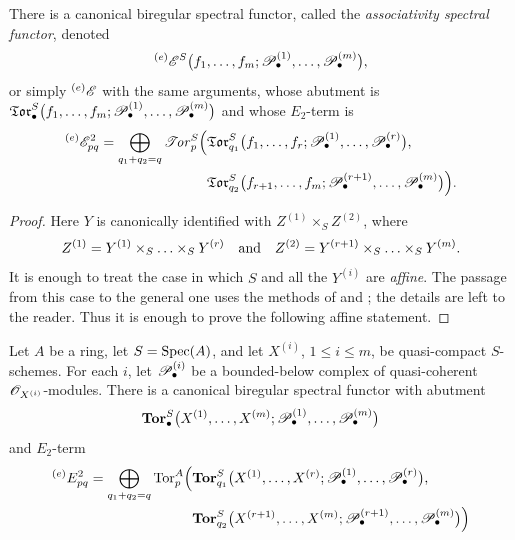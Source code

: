 \begin{proposition}[6.8.2]
\label{III.6.8.2}
There is a canonical biregular spectral functor, called the
\emph{associativity spectral functor}, denoted
\[
  {}^{(e)}\mathscr{E}^S
  \bigl(
    f_1,\ldots,f_m;
    \mathscr{P}_\bullet^{(1)},\ldots,\mathscr{P}_\bullet^{(m)}
  \bigr),
\]
or simply ${}^{(e)}\mathscr{E}$ with the same arguments, whose abutment
is $\mathfrak{Tor}_\bullet^S
\bigl(
f_1,\ldots,f_m;
\mathscr{P}_\bullet^{(1)},\ldots,\mathscr{P}_\bullet^{(m)}
\bigr)$
and whose $E_2$-term is
\[
\begin{split}
  {}^{(e)}\mathscr{E}_{pq}^2
  =
  \bigoplus_{q_1+q_2=q}
  \mathscr{T}\!\mathit{or}_p^S
  \Bigl(
    &
    \mathfrak{Tor}_{q_1}^S
    \bigl(
      f_1,\ldots,f_r;
      \mathscr{P}_\bullet^{(1)},\ldots,\mathscr{P}_\bullet^{(r)}
    \bigr),
    \\
    &
    \mathfrak{Tor}_{q_2}^S
    \bigl(
      f_{r+1},\ldots,f_m;
      \mathscr{P}_\bullet^{(r+1)},\ldots,\mathscr{P}_\bullet^{(m)}
    \bigr)
  \Bigr).
\end{split}
\]
\end{proposition}

\begin{proof}
Here $Y$ is canonically identified with
$Z^{(1)}\times_SZ^{(2)}$, where
\[
  Z^{(1)}
  =
  Y^{(1)}\times_S\ldots\times_SY^{(r)}
  \quad\hbox{and}\quad
  Z^{(2)}
  =
  Y^{(r+1)}\times_S\ldots\times_SY^{(m)}.
\]
It is enough to treat the case in which $S$ and all the
$Y^{(i)}$ are \emph{affine}.  The passage from this case to the general
one uses the methods of  and
; the details are left to the reader.  Thus it is
enough to prove the following affine statement.
\end{proof}

\begin{corollary}[6.8.3]
\label{III.6.8.3}
Let $A$ be a ring, let $S=\operatorname{Spec}(A)$, and let $X^{(i)}$,
$1\leq i\leq m$, be quasi-compact $S$-schemes.  For each $i$, let
$\mathscr{P}_\bullet^{(i)}$ be a bounded-below complex of
quasi-coherent $\mathscr{O}_{X^{(i)}}$-modules.  There is a canonical
biregular spectral functor with abutment
\[
  \mathbf{Tor}_\bullet^S
  \bigl(
    X^{(1)},\ldots,X^{(m)};
    \mathscr{P}_\bullet^{(1)},\ldots,\mathscr{P}_\bullet^{(m)}
  \bigr)
\]
and $E_2$-term
\[
\begin{split}
  {}^{(e)}E_{pq}^2
  =
  \bigoplus_{q_1+q_2=q}
  \operatorname{Tor}_p^A
  \Bigl(
    &
    \mathbf{Tor}_{q_1}^S
    \bigl(
      X^{(1)},\ldots,X^{(r)};
      \mathscr{P}_\bullet^{(1)},\ldots,\mathscr{P}_\bullet^{(r)}
    \bigr),
    \\
    &
    \mathbf{Tor}_{q_2}^S
    \bigl(
      X^{(r+1)},\ldots,X^{(m)};
      \mathscr{P}_\bullet^{(r+1)},\ldots,\mathscr{P}_\bullet^{(m)}
    \bigr)
  \Bigr)
\end{split}
\]
\end{corollary}

